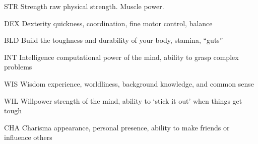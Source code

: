 \documentclass[twoside]{book}
\begin{document}
                 STR   
                    Strength raw physical strength. Muscle power.
                   
                
                
                 DEX   
                   Dexterity quickness, coordination, fine motor
                   control, balance 
                
                
                 BLD   
                   Build the toughness and durability of your body,
                   stamina, “guts” 
                
                
                 INT   
                   Intelligence computational power of the mind,
                   ability to grasp complex problems 
                
                
                 WIS   
                   Wisdom experience, worldliness, background
                   knowledge, and common sense 
                
                
                 WIL   
                   Willpower strength of the mind, ability to
                   ‘stick it out’ when things get tough
                   
                
                
                 CHA   
                   Charisma appearance, personal presence, ability
                   to make friends or influence others 
                
            
\end{document}
